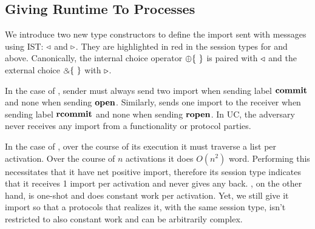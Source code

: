 \subsection{Giving Runtime To Processes}
We introduce two new type constructors to define the import sent with messages using IST: $\triangleleft$ and $\triangleright$.
They are highlighted in red in the session types for \Fcom and \Fro above.
Canonically, the internal choice operator $\ichoice$ is paired with $\triangleleft$ and the external choice $\echoice$ with $\triangleright$.

In the case of \Fcom, sender must always send two import when sending label $\mathbf{commit}$ and none when sending $\mathbf{open}$.
Similarly, \Fcom sends one import to the receiver when sending label $\mathbf{rcommit}$ and none when sending $\mathbf{ropen}$.
In UC, the adversary never receives any import from a functionality or protocol parties.

In the case of \Fro, over the course of its execution it must traverse a list per activation.
Over the course of $n$ activations it does $O(n^2)$ word. 
Performing this necessitates that it have net positive import, therefore its session type indicates that it receives 1 import per activation and never gives any back.
\Fcom, on the other hand, is one-shot and does constant work per activation. Yet, we still give it import so that a protocols that realizes it, with the same session type, isn't restricted to also constant work and can be arbitrarily complex.


% 

